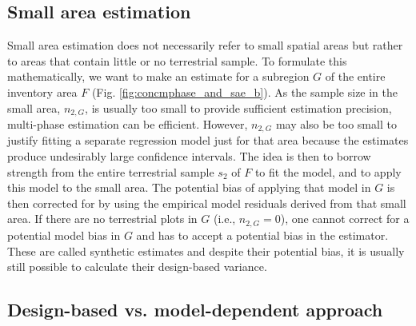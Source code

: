 \subsection{Small area estimation}

Small area estimation does not necessarily refer to small spatial areas but rather to areas that contain little or no terrestrial sample. To formulate this mathematically, we want to make an estimate for a subregion $G$ of the entire inventory area $F$ (Fig. \ref{fig:concmphase_and_sae_b}). As the sample size in the small area, $n_{2,G}$, is usually too small to provide sufficient estimation precision, multi-phase estimation can be efficient. However, $n_{2,G}$ may also be too small to justify fitting a separate regression model just for that area because the estimates produce undesirably large confidence intervals. The idea is then to borrow strength from the entire terrestrial sample $s_2$ of $F$ to fit the model, and to apply this model to the small area. The potential bias of applying that model in $G$ is then corrected for by using the empirical model residuals derived from that small area. If there are no terrestrial plots in $G$ (i.e., $n_{2,G}=0$), one cannot correct for a potential model bias in $G$ and has to accept a potential bias in the estimator. These are called synthetic estimates and despite their potential bias, it is usually still possible to calculate their design-based variance.


\subsection{Design-based vs. model-dependent approach}
\label{sec:db_vs_md}

